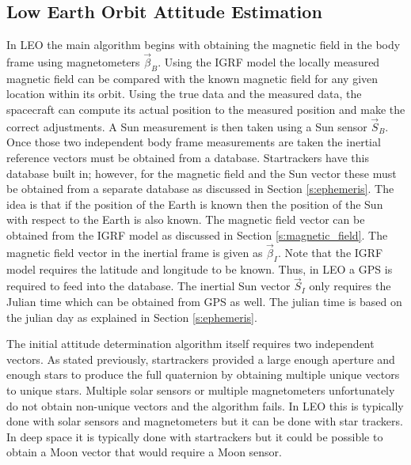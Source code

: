 \documentclass{article}
\begin{document}
\subsection{Low Earth Orbit Attitude Estimation}

In LEO the main algorithm begins with obtaining the magnetic field in
the body frame using magnetometers $\vec{\beta}_B$. Using the IGRF
model the locally measured magnetic field can be 
compared with the known magnetic field for any given location within
its orbit. Using the true data and the measured data, the spacecraft
can compute its actual position to the measured position and make the
correct adjustments. A Sun measurement is then taken using a Sun
sensor $\vec{S}_B$. Once those two independent 
body frame measurements are taken the inertial reference vectors must
be obtained from a database. Startrackers have this database built in;
however, for the magnetic field and the Sun vector these must be
obtained from a separate database as discussed in Section
\ref{s:ephemeris}. The idea is that if the position of the Earth is
known then the position of the Sun with respect to the Earth is also
known. The magnetic field vector can be 
obtained from the IGRF model as discussed in Section
\ref{s:magnetic_field}. The magnetic field vector in the inertial
frame is given as $\vec{\beta}_I$. Note that the IGRF model requires
the latitude and longitude to be known. Thus, in LEO a GPS is required
to feed into the database. The inertial Sun vector $\vec{S}_I$ only
requires the Julian time which can be obtained from GPS as well. The julian time is
based on the julian day as explained in Section \ref{s:ephemeris}.

The initial attitude determination algorithm itself requires two
independent vectors. As stated previously, startrackers provided a
large enough aperture and enough stars to produce the full
quaternion by obtaining multiple unique vectors to unique
stars. Multiple solar sensors or multiple magnetometers unfortunately
do not obtain non-unique vectors and the algorithm fails. In LEO this
is typically done with solar sensors and magnetometers but it can be
done with star trackers. In deep space it is typically done with
startrackers but it could be possible to obtain a Moon vector that
would require a Moon sensor.
\end{document}

